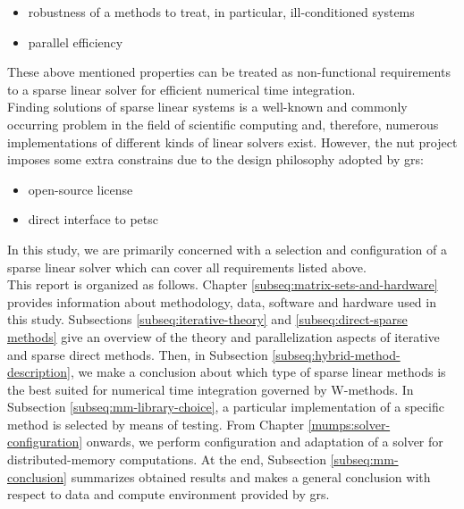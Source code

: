 \begin{itemize}
	\item robustness of a methods to treat, in particular, ill-conditioned systems
	\item parallel efficiency
\end{itemize}


These above mentioned properties can be treated as non-functional requirements to a sparse linear solver for efficient numerical time integration.\\

 
Finding solutions of sparse linear systems is a well-known and commonly occurring problem in the field of scientific computing and, therefore, numerous implementations of different kinds of linear solvers exist. However, the \acrshort{nut} project imposes some extra constrains due to the design philosophy adopted by \acrshort{grs}: \\


\begin{itemize}
	\item open-source license
	\item direct interface to \acrshort{petsc}
\end{itemize}



In this study, we are primarily concerned with a selection and configuration of a  sparse linear solver which can cover all requirements listed above.\\


This report is organized as follows. Chapter \ref{subseq:matrix-sets-and-hardware} provides information about methodology, data, software and hardware used in this study. Subsections \ref{subseq:iterative-theory} and \ref{subseq:direct-sparse methods} give an overview of the theory and parallelization aspects of iterative and sparse direct methods. Then, in Subsection \ref{subseq:hybrid-method-description}, we make a conclusion about which type of sparse linear methods is the best suited for numerical time integration governed by W-methods. In Subsection 
\ref{subseq:mm-library-choice}, a particular implementation of a specific method is selected by means of testing. From Chapter \ref{mumps:solver-configuration} onwards, we perform configuration and adaptation of a solver for distributed-memory computations. At the end, Subsection \ref{subseq:mm-conclusion} summarizes obtained results and makes a general conclusion with respect to data and compute environment provided by  \acrshort{grs}.\\




